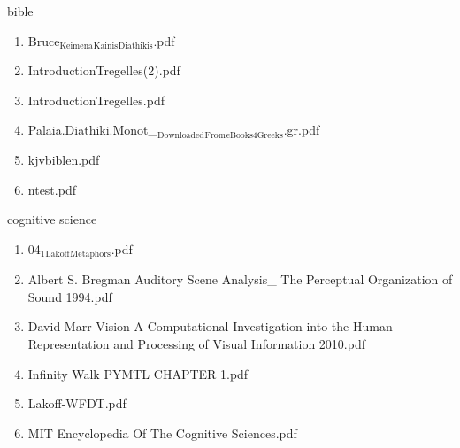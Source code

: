 \documentclass[11pt]{article}
\begin{document}
\item bible
\label{sec-1-1-1-1-13}
\begin{enumerate}
\item Bruce$_{\text{Keimena}}$$_{\text{Kainis}}$$_{\text{Diathikis}}$.pdf
\label{sec-1-1-1-1-13-1}

\item IntroductionTregelles(2).pdf
\label{sec-1-1-1-1-13-2}

\item IntroductionTregelles.pdf
\label{sec-1-1-1-1-13-3}

\item Palaia.Diathiki.Monot\_$_{\text{Downloaded}}$$_{\text{From}}$$_{\text{eBooks4Greeks}}$.gr.pdf
\label{sec-1-1-1-1-13-4}

\item kjvbiblen.pdf
\label{sec-1-1-1-1-13-5}

\item ntest.pdf
\label{sec-1-1-1-1-13-6}
\end{enumerate}

\item cognitive science
\label{sec-1-1-1-1-14}
\begin{enumerate}
\item 04$_{\text{1}}$$_{\text{Lakoff}}$$_{\text{Metaphors}}$.pdf
\label{sec-1-1-1-1-14-1}

\item Albert S. Bregman Auditory Scene Analysis\_ The Perceptual Organization of Sound  1994.pdf
\label{sec-1-1-1-1-14-2}

\item David Marr Vision A Computational Investigation into the Human Representation and Processing of Visual Information    2010.pdf
\label{sec-1-1-1-1-14-3}

\item Infinity Walk PYMTL CHAPTER 1.pdf
\label{sec-1-1-1-1-14-4}

\item Lakoff-WFDT.pdf
\label{sec-1-1-1-1-14-5}

\item MIT Encyclopedia Of The Cognitive Sciences.pdf
\label{sec-1-1-1-1-14-6}
\end{enumerate}
\end{document}
